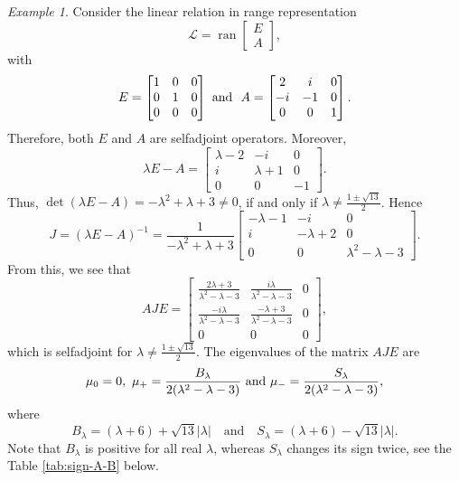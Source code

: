 \documentclass{birkjour}
\theoremstyle{definition}
\theoremstyle{remark}
\newtheorem*{ex}{Example}
\numberwithin{equation}{section}
\DeclareMathOperator{\ran}{ran}
\begin{document}
\begin{ex} Consider the
linear relation in range representation
    \[
\mathcal{L}=\ran \begin{bmatrix}
    E\\ A
\end{bmatrix},
\]
with $$E=\begin{bmatrix}
     1&0 & 0\\0&1&0 \\ 0& 0&0 
\end{bmatrix} \ \hbox{and} \ \ A=\begin{bmatrix}
    2&i&0\\-i&-1&0 \\ 0 & 0&1
\end{bmatrix}.$$ 
Therefore, both $E$ and $A$ are selfadjoint operators. Moreover, $$\lambda E-A=  \begin{bmatrix}
    \lambda -2 & -i  &0\\i& \lambda +1 & 0 \\ 0 & 0& -1
\end{bmatrix}. $$ Thus, $\det(\lambda E -A)=-\lambda^2+\lambda+3\neq 0$, if and only if $\lambda \neq \frac{1\pm \sqrt{13}}{2}$. Hence $$ J=(\lambda E-A)^{-1}= \frac{1}{-\lambda^2+\lambda+3} \begin{bmatrix}
    -\lambda-1 &-i & 0\\i& -\lambda +2 & 0 \\ 0 & 0 & \lambda^2 -\lambda -3
\end{bmatrix}.$$
From this, we see that 
$$ 
AJE=\begin{bmatrix}
    \frac{2\lambda+3}{\lambda^2-\lambda-3}&  \frac{i\lambda}{\lambda^2-\lambda-3} & 0\\\frac{-i\lambda}{\lambda^2-\lambda-3}& \frac{-\lambda+3}{\lambda^2-\lambda-3}&0 \\ 0 & 0& 0
\end{bmatrix},
$$
which is selfadjoint for $\lambda \neq \frac{1\pm \sqrt{13}}{2}$. The eigenvalues of the matrix $AJE$ are 
\begin{equation} \label{HelpMe}
\mu_0=0, \ \mu_+= \frac{B_\lambda}{2(\lambda^2-\lambda-3)} \ \hbox{and} \ \mu_-= \frac{S_\lambda}{2(\lambda^2-\lambda-3)}, 
\end{equation}
where 
$$
B_\lambda= (\lambda+6)+\sqrt{13} |\lambda|\quad \mbox{and}\quad S_\lambda=(\lambda+6)-\sqrt{13} |\lambda|.
$$
Note that $B_\lambda$ is positive for all real $\lambda$, whereas $S_\lambda$ changes its sign twice, see the Table
\ref{tab:sign-A-B} below.
\begin{table}[ht] \label{EINS}

\end{table}
\end{ex}
\end{document}
